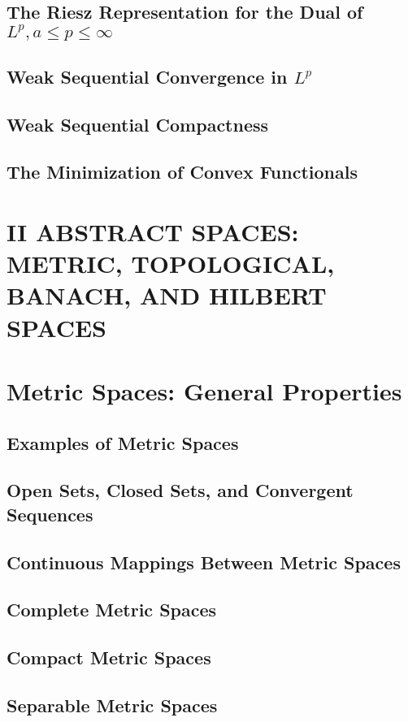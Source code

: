 \documentclass[a4paper,10pt]{book}
\theoremstyle{plain} %
\begin{document}
\section{The Riesz Representation for the Dual of $L^p,a\le p\le \infty$}
\section{Weak Sequential Convergence in $L^p$}
\section{Weak Sequential Compactness}
\section{The Minimization of Convex Functionals}

\setcounter{chapter}{0}
\chapter*{II ABSTRACT SPACES: METRIC, TOPOLOGICAL, BANACH, AND HILBERT SPACES}
\setcounter{chapter}{8}

\chapter{Metric Spaces: General Properties}

\section{Examples of Metric Spaces}
\section{Open Sets, Closed Sets, and Convergent Sequences}
\section{Continuous Mappings Between Metric Spaces}
\section{Complete Metric Spaces}
\section{Compact Metric Spaces}
\section{Separable Metric Spaces}
\end{document}
